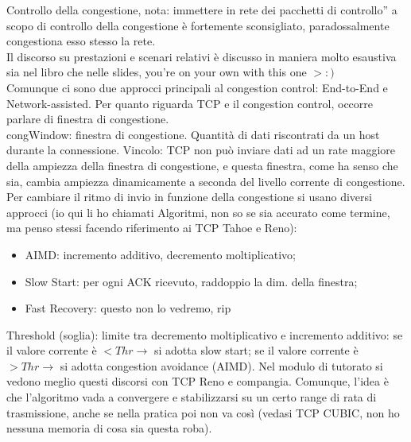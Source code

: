 \noindent Controllo della congestione, nota: immettere in rete dei \openapex pacchetti di controllo'' a scopo di controllo della congestione è fortemente sconsigliato, paradossalmente congestiona esso stesso la rete.\\

\noindent Il discorso su prestazioni e scenari relativi è discusso in maniera molto esaustiva sia nel libro che nelle slides, you're on your own with this one $>:)$\\

\noindent Comunque ci sono due approcci principali al congestion control: End-to-End e Network-assisted. Per quanto riguarda TCP e il congestion control, occorre parlare di finestra di congestione.\\
\noindent congWindow: finestra di congestione. Quantità di dati riscontrati da un host durante la connessione. Vincolo: TCP non può inviare dati ad un rate maggiore della ampiezza della finestra di congestione, e questa finestra, come ha senso che sia, cambia ampiezza dinamicamente a seconda del livello corrente di congestione. Per cambiare il ritmo di invio in funzione della congestione si usano diversi approcci (io qui li ho chiamati Algoritmi, non so se sia accurato come termine, ma penso stessi facendo riferimento ai TCP Tahoe e Reno):
    \begin{itemize}
        \item AIMD: incremento additivo, decremento moltiplicativo;
        \item Slow Start: per ogni ACK ricevuto, raddoppio la dim. della finestra;
        \item Fast Recovery: questo non lo vedremo, rip
    \end{itemize}
\noindent Threshold (soglia): limite tra decremento moltiplicativo e incremento additivo: se il valore corrente è $<Thr \rightarrow$ si adotta slow start; se il valore corrente è $>Thr\rightarrow$ si adotta congestion avoidance (AIMD). Nel modulo di tutorato si vedono meglio questi discorsi con TCP Reno e compangia. Comunque, l'idea è che l'algoritmo vada a convergere e stabilizzarsi su un certo range di rata di trasmissione, anche se nella pratica poi non va così (vedasi TCP CUBIC, non ho nessuna memoria di cosa sia questa roba).\\

